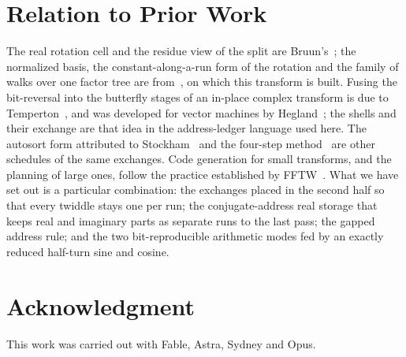 \documentclass[conference]{IEEEtran}
\begin{document}
\section{Relation to Prior Work}

The real rotation cell and the residue view of the split are Bruun's~\cite{bruun}; the normalized basis, the constant-along-a-run form of the rotation and the family of walks over one factor tree are from~\cite{obr}, on which this transform is built.
Fusing the bit-reversal into the butterfly stages of an in-place complex transform is due to Temperton~\cite{temperton}, and was developed for vector machines by Hegland~\cite{hegland,hegland2}; the shells and their exchange are that idea in the address-ledger language used here.
The autosort form attributed to Stockham~\cite{stockham} and the four-step method~\cite{bailey} are other schedules of the same exchanges.
Code generation for small transforms, and the planning of large ones, follow the practice established by FFTW~\cite{fftw}.
What we have set out is a particular combination: the exchanges placed in the second half so that every twiddle stays one per run; the conjugate-address real storage that keeps real and imaginary parts as separate runs to the last pass; the gapped address rule; and the two bit-reproducible arithmetic modes fed by an exactly reduced half-turn sine and cosine.

\section*{Acknowledgment}
This work was carried out with Fable, Astra, Sydney and Opus.
\end{document}

